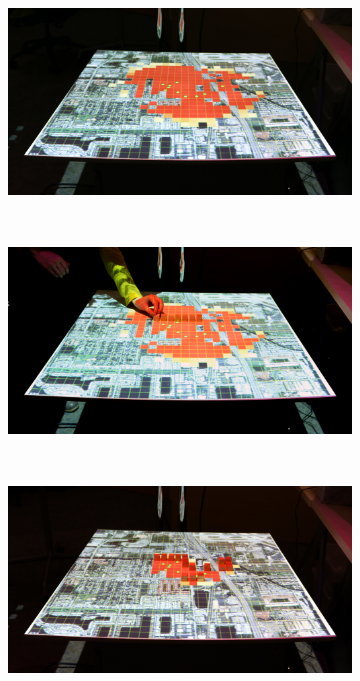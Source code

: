 \documentclass{article}
\begin{document}

\begin{figure}
        \centering
        \begin{subfigure}[t]{0.3\textwidth}
                \includegraphics[trim={0 0 0 1cm},clip,width=\textwidth]{termite_game_1}
        \end{subfigure}
        ~ %
        \begin{subfigure}[t]{0.3\textwidth}
                \includegraphics[trim={0 0 0 1cm},clip,width=\textwidth]{termite_game_2}
        \end{subfigure}
        ~ %
        \begin{subfigure}[t]{0.3\textwidth}
                \includegraphics[trim={0 0 0 1cm},clip,width=\textwidth]{termite_game_3}

\end{subfigure}
\end{figure}
\end{document}
